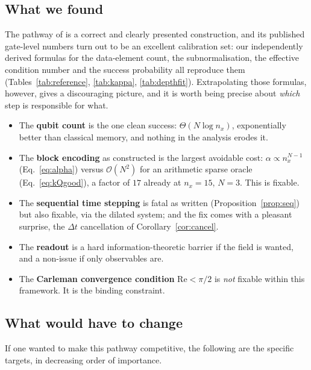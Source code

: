 \documentclass[11pt,a4paper]{article}
\theoremstyle{plain}
\theoremstyle{definition}
\theoremstyle{remark}
\newcommand{\Rey}{\mathrm{Re}}
\newcommand{\Oh}{\mathcal{O}}
\begin{document}
\subsection{What we found}

The pathway of \cite{Setty2026} is a correct and clearly presented construction,
and its published gate-level numbers turn out to be an excellent calibration set:
our independently derived formulas for the data-element count, the
subnormalisation, the effective condition number and the success probability all
reproduce them (Tables~\ref{tab:reference}, \ref{tab:kappa}, \ref{tab:depthfit}).
Extrapolating those formulas, however, gives a discouraging picture, and it is
worth being precise about \emph{which} step is responsible for what.

\begin{itemize}[leftmargin=*]
\item The \textbf{qubit count} is the one clean success:
$\Theta(N\log n_x)$, exponentially better than classical memory, and nothing in
the analysis erodes it.
\item The \textbf{block encoding} as constructed is the largest avoidable cost:
$\alpha\propto n_x^{N-1}$ (Eq.~\eqref{eq:alpha}) versus $\Oh(N^2)$ for an
arithmetic sparse oracle (Eq.~\eqref{eq:kQgood}), a factor of $17$ already at
$n_x=15$, $N=3$.  This is fixable.
\item The \textbf{sequential time stepping} is fatal as written
(Proposition~\ref{prop:seq}) but also fixable, via the dilated system; and the
fix comes with a pleasant surprise, the $\Delta t$ cancellation of
Corollary~\ref{cor:cancel}.
\item The \textbf{readout} is a hard information-theoretic barrier if the field
is wanted, and a non-issue if only observables are.
\item The \textbf{Carleman convergence condition} $\Rey<\pi/2$ is
\emph{not} fixable within this framework.  It is the binding constraint.
\end{itemize}

\subsection{What would have to change}

If one wanted to make this pathway competitive, the following are the specific
targets, in decreasing order of importance.
\end{document}
